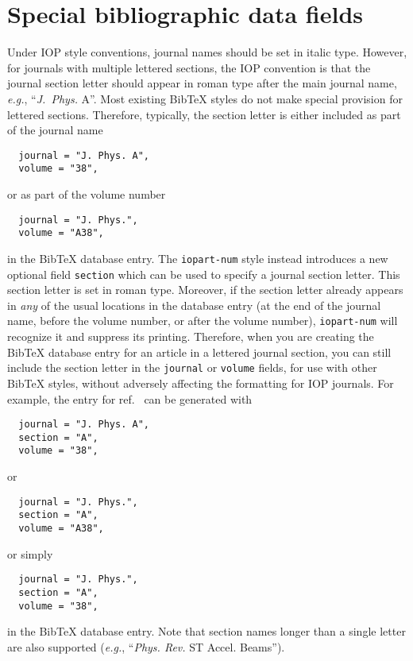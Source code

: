 \documentclass[12pt]{iopart}
\newcommand{\BibTeX}{Bib\TeX}
\begin{document}
\section{Special bibliographic data fields}

Under IOP style conventions, journal names should be set in italic
type.  However, for journals with multiple lettered sections, the IOP
convention is that the journal section letter should appear in roman
type after the main journal name, \textit{e.g.}, ``\textit{J.\
  Phys.\/} A''.  Most existing \BibTeX{} styles do not make special
provision for lettered sections.  Therefore, typically, the section
letter is either included as part of the journal name
\begin{verbatim}
  journal = "J. Phys. A",
  volume = "38",
\end{verbatim}
or as part of the volume number
\begin{verbatim}
  journal = "J. Phys.",
  volume = "A38",
\end{verbatim}
in the \BibTeX{} database entry.  The \texttt{iopart-num} style
instead introduces a new optional field \verb+section+ which can be
used to specify a journal section letter.  This section letter is set in
roman type.  Moreover, if the section letter already appears in
\textit{any} of the usual locations in the database entry (at the end
of the journal name, before the volume number, or after the volume
number),
\texttt{iopart-num} will recognize it and suppress its printing.
Therefore, when you are creating the
\BibTeX{} database entry for an article in a lettered journal section,
you can still include the section letter in the \verb+journal+ or
\verb+volume+ fields, for use with other \BibTeX{} styles,
without adversely affecting the formatting for IOP journals.  For
example, the entry for ref.~\cite{caprio2005:coherent} can be
generated with
\begin{verbatim}
  journal = "J. Phys. A",
  section = "A",
  volume = "38",
\end{verbatim}
or
\begin{verbatim}
  journal = "J. Phys.",
  section = "A",
  volume = "A38",
\end{verbatim}
or simply
\begin{verbatim}
  journal = "J. Phys.",
  section = "A",
  volume = "38",
\end{verbatim}
in the \BibTeX{} database entry.  Note that section names longer than a
single letter are also supported (\textit{e.g.},
``\textit{Phys. Rev.\/} ST Accel. Beams'').
\end{document}
